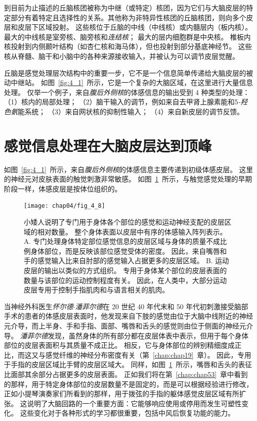到目前为止描述的丘脑核团被称为中继（或特定）核团，因为它们与大脑皮层的特定部分有着特定且选择性的关系。其他称为非特异性核团的丘脑核团，则向多个皮层和皮层下区域投射。
这些核位于丘脑的中线（中线核）或内髓层内（板内核）。 
最大的中线核是室旁核、脑旁核和\textit{连结核}；
最大的层内细胞群是中央核。 
椎板内核投射到内侧颞叶结构（如杏仁核和海马体），但也投射到部分基底神经节。
这些核从脊髓、脑干和小脑中的各种来源接收输入，并被认为可以调节皮层觉醒。


丘脑是感觉处理层次结构中的重要一步，它不是一个信息简单传递给大脑皮层的被动中继站。 
如图~\ref{fig:4_1}~所示，它是一个复杂的大脑区域，在这里进行大量信息处理。 
仅举一个例子，来自\textit{腹后外侧核}的体感信息的输出受到 4 种类型的处理：
（1）核内的局部处理；
（2）脑干输入的调节，例如来自去甲肾上腺素能和5\textit{-羟色氨}能系统；
（3）来自网状核的抑制性输入； 
（4）来自新皮层的调节反馈。


\section{感觉信息处理在大脑皮层达到顶峰}

如图~\ref{fig:4_1}~所示，来自\textit{腹后外侧核}的体感信息主要传递到初级体感皮层。 
这里的神经元对皮肤表面的触觉刺激非常敏感。
如图~\ref{fig:4_8}~所示，与触觉感觉处理的早期阶段一样，体感皮层是按体位组织的。


\begin{figure}[htbp]
	\centering
	\texttt{[image: chap04/fig\_4\_8]}
	\caption{小矮人说明了专门用于身体各个部位的感觉和运动神经支配的皮层区域的相对数量。
		整个身体表面以皮层中有序的体感输入阵列表示。
		A. 专门处理身体特定部位感觉信息的皮层区域与身体的质量不成比例身体部位，而是反映该部位感觉受体的密度。
		因此，来自嘴唇和手的感觉输入比来自肘部的感觉输入占据更多的皮层区域。
		B. 运动皮层的输出以类似的方式组织。
		专用于身体某个部位的皮层表面的数量与该部位的运动控制程度有关。
		因此，在人类中，大部分运动皮层专用于控制手指肌肉和与语言相关的肌肉。}
	\label{fig:4_8}
\end{figure}


当神经外科医生\textit{怀尔德$\cdot$潘菲尔德}在 20 世纪 40 年代末和 50 年代初刺激接受脑部手术的患者的体感皮层表面时，他发现来自下肢的感觉由位于大脑中线附近的神经元介导，而上半身、手和手指、面部、嘴唇和舌头的感觉则由位于侧面的神经元介导。
\textit{潘菲尔德}发现，虽然身体的所有部分都在皮层体表中表示，但用于每个身体部位的皮层表面积与其质量不成正比。 
相反，它与身体部位的辨别精细度成正比，而这又与感觉纤维的神经分布密度有关（第~\ref{chap:chap19}~章）。 
因此，专用于手指的皮层区域比手臂的皮层区域大。 
同样，如图~\ref{fig:4_8}~所示，嘴唇和舌头的表征比面部其余部分占据更多的皮层表面。
正如我们将在第~\ref{chap:chap53}~章中看到的那样，用于特定身体部位的皮层数量不是固定的，而是可以根据经验进行修改，正如小提琴演奏家们所看到的那样，用于拨弦的手指的躯体感觉皮层区域有所扩张。
这说明了大脑回路的一个重要方面：它能够响应使用或停用而发生可塑性变化。
这些变化对于各种形式的学习都很重要，包括中风后恢复功能的能力。


